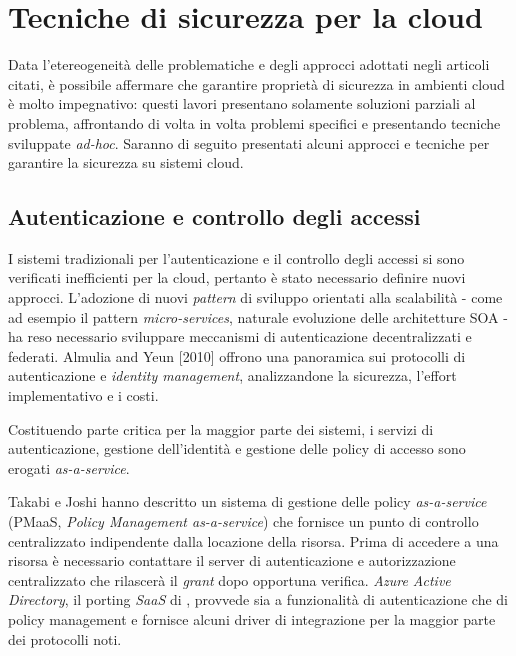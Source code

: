 \documentclass[../main.tex]{subfiles}
\begin{document}
\section{Tecniche di sicurezza per la cloud}
Data l'etereogeneità delle problematiche e degli approcci adottati negli articoli citati, è possibile affermare che garantire proprietà di sicurezza in ambienti cloud è molto impegnativo: questi lavori presentano solamente soluzioni parziali al problema, affrontando di volta in volta problemi specifici e presentando tecniche sviluppate \textit{ad-hoc}\cite{Ardagna:2015:SAC:2808687.2767005}.
Saranno di seguito presentati alcuni approcci e tecniche per garantire la sicurezza su sistemi cloud.

\subsection{Autenticazione e controllo degli accessi}
I sistemi tradizionali per l'autenticazione e il controllo degli accessi si sono verificati inefficienti per la cloud, pertanto è stato necessario definire nuovi approcci. L'adozione di nuovi \textit{pattern} di sviluppo orientati alla scalabilità - come ad esempio il pattern \textit{micro-services}, naturale evoluzione delle architetture SOA - ha reso necessario sviluppare meccanismi di autenticazione decentralizzati e federati.
Almulia and Yeun [2010] offrono una panoramica sui protocolli di autenticazione e \textit{identity management}, analizzandone la sicurezza, l'effort implementativo e i costi\cite{Ieee5542654}.

Costituendo parte critica per la maggior parte dei sistemi, i servizi di autenticazione, gestione dell'identità e gestione delle policy di accesso sono erogati \textit{as-a-service}.

Takabi e Joshi hanno descritto un sistema di gestione delle policy \textit{as-a-service} (PMaaS, \textit{Policy Management as-a-service}) che fornisce un punto di controllo centralizzato indipendente dalla locazione della risorsa\cite{pittir13526}.
Prima di accedere a una risorsa è necessario contattare il server di autenticazione e autorizzazione centralizzato che rilascerà il \textit{grant} dopo opportuna verifica.
\textit{Azure Active Directory}, il porting \textit{SaaS} di , provvede sia a funzionalità di autenticazione che di policy management e fornisce alcuni driver di integrazione per la maggior parte dei protocolli noti.
\end{document}
